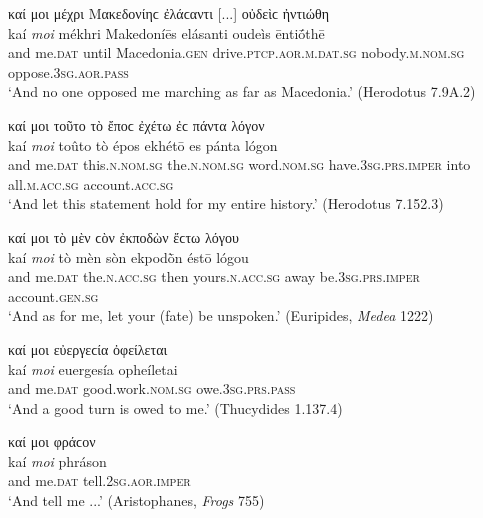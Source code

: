 \begin{exe}
\ex καί μοι μέχρι Μακεδονίηϲ ἐλάϲαντι {[}...{]} οὐδεὶϲ ἠντιώθη\\
\gll kaí \emph{moi} mékhri Makedoníēs elásanti oudeìs ēntiṓthē\\
and me.\textsc{dat} until Macedonia.\textsc{gen} drive.\textsc{ptcp.aor.m.dat.sg} nobody.\textsc{m.nom.sg} oppose.\textsc{3sg.aor.pass}\\
\trans `And no one opposed me marching as far as Macedonia.' (Herodotus 7.9A.2)
\label{kaimoi31}
\end{exe}

\begin{exe}
\ex καί μοι τοῦτο τὸ ἔποϲ ἐχέτω ἐϲ πάντα λόγον\\
\gll kaí \emph{moi} toûto tò épos ekhétō es pánta lógon\\
and me.\textsc{dat} this.\textsc{n.nom.sg} the.\textsc{n.nom.sg}
word.\textsc{nom.sg} have.\textsc{3sg.prs.imper} into all.\textsc{m.acc.sg} account.\textsc{acc.sg}\\
\trans `And let this statement hold for my entire history.' (Herodotus 7.152.3)
\label{kaimoi32}
\end{exe}

\begin{exe}
\ex καί μοι τὸ μὲν ϲὸν ἐκποδὼν ἔϲτω λόγου\\
\gll kaí \emph{moi} tò mèn sòn ekpodṑn éstō lógou\\
and me.\textsc{dat} the.\textsc{n.acc.sg} then yours.\textsc{n.acc.sg}
away be.\textsc{3sg.prs.imper} account.\textsc{gen.sg}\\
\trans `And as for me, let your (fate) be unspoken.' (Euripides, \textit{Medea} 1222)
\label{kaimoi33}
\end{exe}

\begin{exe}
\ex καί μοι εὐεργεϲία ὀφείλεται\\
\gll kaí \emph{moi} euergesía opheíletai\\
and me.\textsc{dat} good.work.\textsc{nom.sg} owe.\textsc{3sg.prs.pass}\\
\trans `And a good turn is owed to me.' (Thucydides 1.137.4)
\label{kaimoi34}
\end{exe}

\begin{exe}
\ex καί μοι φράϲον\\
\gll kaí \emph{moi} phráson\\
and me.\textsc{dat} tell.\textsc{2sg.aor.imper}\\
\trans `And tell me ...' (Aristophanes, \textit{Frogs} 755)
\label{kaimoi35}
\end{exe}

